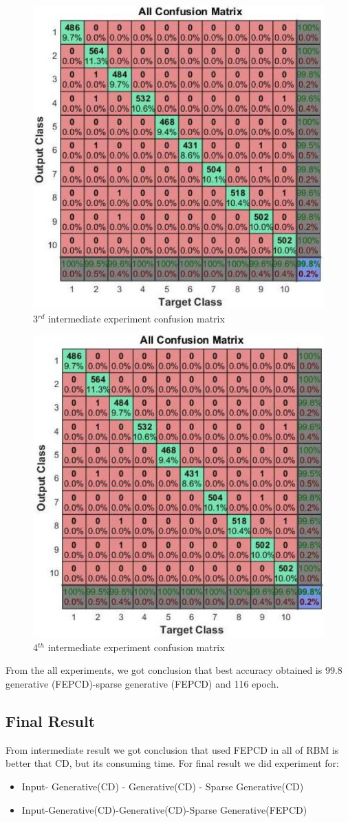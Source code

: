 \documentclass[conference]{IEEEtran}
\begin{document}
\begin{figure}[h]
	\centering
	\includegraphics[width=.5\textwidth]{pics/fig8.jpg}
	\caption{3$^{rd}$ intermediate experiment confusion matrix}
	\label{fig8}
\end{figure}

\begin{figure}[h]
	\centering
	\includegraphics[width=.5\textwidth]{pics/fig9.jpg}
	\caption{4$^{th}$ intermediate experiment confusion matrix}
	\label{fig9}
\end{figure}

From the all experiments, we got conclusion that best
accuracy obtained is 99.8%
generative (FEPCD)-sparse generative (FEPCD) and 116
epoch.
\subsection{Final Result}
From intermediate result we got conclusion that used
FEPCD in all of RBM is better that CD, but its consuming
time. For final result we did experiment for:
\begin{itemize}
	\item Input- Generative(CD) - Generative(CD) - Sparse
	Generative(CD)
	\item Input-Generative(CD)-Generative(CD)-Sparse
	Generative(FEPCD)
\end{itemize}
\end{document}
